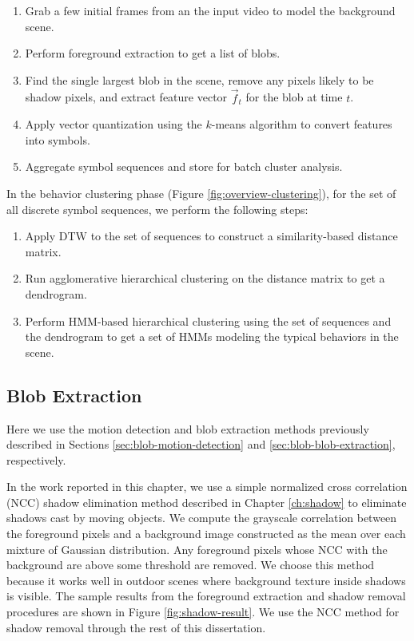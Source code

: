 \begin{enumerate}
  \item Grab a few initial frames from an the input video to model the
    background scene.
  \item Perform foreground extraction to get a list of blobs.
  \item Find the single largest blob in the scene, remove any pixels
    likely to be shadow pixels, and extract feature vector $\vec{f}_t$
    for the blob at time $t$. \DIFaddbegin {}\DIFaddend \item Apply vector quantization using the $k$-means algorithm to
    convert features into symbols.
  \item Aggregate symbol sequences and store for batch cluster
    analysis.
\end{enumerate}

In the behavior clustering phase
(Figure \ref{fig:overview-clustering}), for the set of all discrete
symbol sequences, we perform the following steps:

\begin{enumerate}
  \item Apply DTW to the set of sequences to construct a
    similarity-based distance matrix.
  \item Run agglomerative hierarchical clustering on the distance
    matrix to get a dendrogram.
  \item Perform HMM-based hierarchical clustering using the set of
    sequences and the dendrogram to get a set of HMMs modeling the
    typical behaviors in the scene.
\end{enumerate}

\subsection{Blob Extraction}
\label{sec:clustering-blob-extraction}

Here we use the motion detection and blob extraction methods
previously described in Sections \ref{sec:blob-motion-detection}
and \ref{sec:blob-blob-extraction}, respectively.

In the work reported in this chapter, we use a simple normalized cross
correlation (NCC) shadow elimination method described in
Chapter \ref{ch:shadow} to eliminate shadows cast by moving objects.
We compute the grayscale correlation between the foreground pixels and
a background image constructed as the mean over each mixture of
Gaussian distribution. Any foreground pixels whose NCC with the
background are above some threshold are removed. We choose this method
because it works well in outdoor scenes where background texture
inside shadows is visible.  The sample results from the foreground
extraction and shadow removal procedures are shown in
Figure \ref{fig:shadow-result}. We use the NCC method for shadow
removal through the rest of this dissertation.

